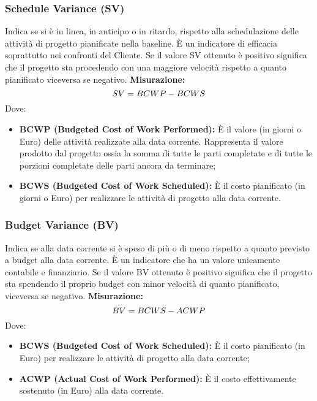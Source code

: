 	 	\subsubsection{Schedule Variance (SV)} Indica se si è in linea, in anticipo o in ritardo, rispetto alla schedulazione delle
attività di progetto pianificate nella baseline.
	 	È un indicatore di efficacia soprattutto nei confronti del Cliente.
	 	Se il valore SV ottenuto è positivo significa che il progetto sta procedendo con una
maggiore velocità rispetto a quanto pianificato viceversa se negativo.\newline
	 	\textbf{Misurazione:}
\newline
	 	\[
	 		SV = BCWP-BCWS \newline
	 	\]
 		Dove:
 		\begin{itemize}
 			\item \textbf{BCWP (Budgeted Cost of Work Performed):} È il valore (in giorni
o Euro) delle attività realizzate alla data corrente. Rappresenta il valore
prodotto dal progetto ossia la somma di tutte le parti completate e di tutte
le porzioni completate delle parti ancora da terminare;
 			\item \textbf{BCWS (Budgeted Cost of Work Scheduled):} È il costo pianificato (in giorni o Euro) per realizzare le attività di progetto alla data corrente. \newline
 		\end{itemize}
	 	\subsubsection{Budget Variance (BV)} Indica se alla data corrente si è speso di più o di meno rispetto a quanto previsto
a budget alla data corrente.
	 	È un indicatore che ha un valore unicamente contabile e finanziario.
	 	Se il valore BV ottenuto è positivo significa che il progetto sta spendendo il proprio
budget con minor velocità di quanto pianificato, viceversa se negativo.\newline
	 	\textbf{Misurazione:}
\newline
	 	\[
	 		BV = BCWS-ACWP \newline
	 	\]
	 	Dove:
	 	\begin{itemize}
	 		\item \textbf{BCWS (Budgeted Cost of Work Scheduled):} È il costo pianificato (in Euro) per realizzare le attività di progetto alla data corrente;

	 		\item \textbf{ACWP (Actual Cost of Work Performed):} È il costo effettivamente sostenuto (in Euro) alla data corrente.
\newline
	 	\end{itemize}

